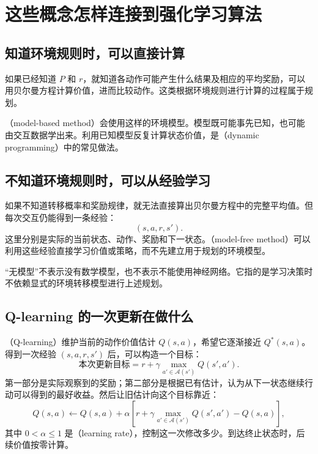 \documentclass[UTF8]{ctexart}
\begin{document}
\section{这些概念怎样连接到强化学习算法}
\label{sec:mdp-algorithms}

\subsection{知道环境规则时，可以直接计算}

如果已经知道 $P$ 和 $r$，就知道各动作可能产生什么结果及相应的平均奖励，可以用贝尔曼方程计算价值，进而比较动作。这类根据环境规则进行计算的过程属于规划。

（model-based method）会使用这样的环境模型。模型既可能事先已知，也可能由交互数据学出来。利用已知模型反复计算状态价值，是（dynamic programming）中的常见做法。

\subsection{不知道环境规则时，可以从经验学习}

如果不知道转移概率和奖励规律，就无法直接算出贝尔曼方程中的完整平均值。但每次交互仍能得到一条经验：
\[
  (s,a,r,s').
\]
这里分别是实际的当前状态、动作、奖励和下一状态。（model-free method）可以利用这些经验直接学习价值或策略，而不先建立用于规划的环境模型。

“无模型”不表示没有数学模型，也不表示不能使用神经网络。它指的是学习决策时不依赖显式的环境转移模型进行上述规划。

\subsection{Q-learning 的一次更新在做什么}

（Q-learning）维护当前的动作价值估计 $Q(s,a)$，希望它逐渐接近 $Q^*(s,a)$。得到一次经验 $(s,a,r,s')$ 后，可以构造一个目标：
\[
  \text{本次更新目标}=r+\gamma\max_{a'\in\mathcal A(s')}Q(s',a').
\]
第一部分是实际观察到的奖励；第二部分是根据已有估计，认为从下一状态继续行动可以得到的最好收益。然后让旧估计向这个目标靠近：
\begin{equation}
  Q(s,a)\leftarrow Q(s,a)+\alpha
  \left[r+\gamma\max_{a'\in\mathcal A(s')}Q(s',a')-Q(s,a)\right],
  \label{eq:mdp-q-learning}
\end{equation}
其中 $0<\alpha\leq1$ 是（learning rate），控制这一次修改多少。到达终止状态时，后续价值按零计算。
\end{document}
